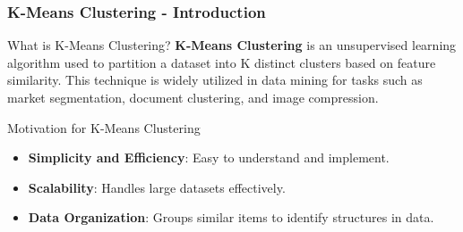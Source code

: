 \documentclass[aspectratio=169]{beamer}
\begin{document}
\begin{frame}[fragile]
    \frametitle{K-Means Clustering - Introduction}
    \begin{block}{What is K-Means Clustering?}
        \textbf{K-Means Clustering} is an unsupervised learning algorithm used to partition a dataset into K distinct clusters based on feature similarity. This technique is widely utilized in data mining for tasks such as market segmentation, document clustering, and image compression.
    \end{block}
    
    \begin{block}{Motivation for K-Means Clustering}
        \begin{itemize}
            \item \textbf{Simplicity and Efficiency}: Easy to understand and implement.
            \item \textbf{Scalability}: Handles large datasets effectively.
            \item \textbf{Data Organization}: Groups similar items to identify structures in data.
        \end{itemize}
    \end{block}
\end{frame}
\end{document}
